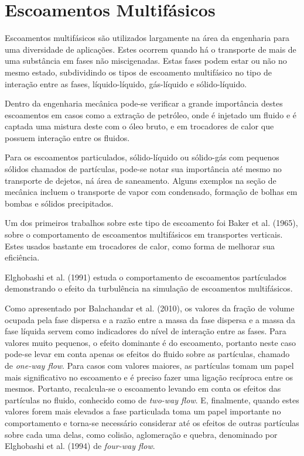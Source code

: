 \section{\textbf{Escoamentos Multifásicos}}
\label{sec_rev_MF}
Escoamentos multifásicos são utilizados largamente na área da engenharia para uma diversidade de aplicações.
Estes ocorrem quando há o transporte de mais de uma substância em fases não miscigenadas.
Estas fases podem estar ou não no mesmo estado, subdividindo os tipos de escoamento multifásico no tipo de interação entre as fases, líquido-líquido, gás-líquido e sólido-líquido.

Dentro da engenharia mecânica pode-se verificar a grande importância destes escoamentos em casos como a extração de petróleo, onde é injetado um fluido e é captada uma mistura deste com o óleo bruto, e em trocadores de calor que possuem interação entre os fluidos.

Para os escoamentos particulados, sólido-líquido ou sólido-gás com pequenos sólidos chamados de partículas, pode-se notar sua importância até mesmo no transporte de dejetos, ná área de saneamento.%
Alguns exemplos na seção de mecânica incluem o transporte de vapor com condensado, formação de bolhas em bombas e sólidos precipitados.

Um dos primeiros trabalhos sobre este tipo de escoamento foi Baker et al. (1965)\cite{Baker-1965}, sobre o comportamento de escoamentos multifásicos em transportes verticais.
Estes usados bastante em trocadores de calor, como forma de melhorar sua eficiência.

Elghobashi et al. (1991)\cite{Elghobashi-1991} estuda o comportamento de escoamentos partículados demonstrando o efeito da turbulência na simulação de escoamentos multifásicos.

Como apresentado por Balachandar et al. (2010)\cite{Balachandar-2010}, os valores da fração de volume ocupada pela fase dispersa e a razão entre a massa da fase dispersa e a massa da fase líquida servem como indicadores do nível de interação entre as fases.
Para valores muito pequenos, o efeito dominante é do escoamento, portanto neste caso pode-se levar em conta apenas os efeitos do fluido sobre as partículas, chamado de \textit{one-way flow}.
Para casos com valores maiores, as partículas tomam um papel mais significativo no escoamento e é preciso fazer uma ligação recíproca entre os mesmos.
Portanto, recalcula-se o escoamento levando em conta os efeitos das partículas no fluido, conhecido como de \textit{two-way flow}.
E, finalmente, quando estes valores forem mais elevados a fase particulada toma um papel importante no comportamento e torna-se necessário considerar até os efeitos de outras partículas sobre cada uma delas, como colisão, aglomeração e quebra, denominado por Elghobashi et al. (1994)\cite{Elghobashi-1994} de \textit{four-way flow}.

